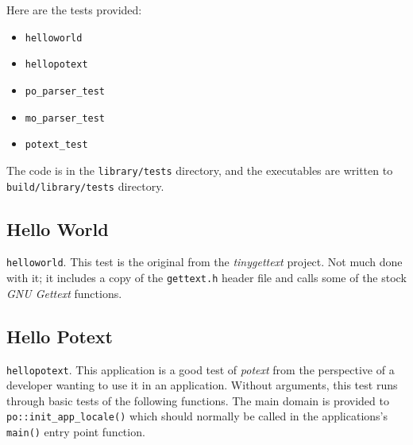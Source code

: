    Here are the tests provided:

    \begin{itemize}
        \item \texttt{helloworld}
        \item \texttt{hellopotext}
        \item \texttt{po\_parser\_test}
        \item \texttt{mo\_parser\_test}
        \item \texttt{potext\_test}
    \end{itemize}

   The code is in the \texttt{library/tests} directory, and the
   executables are written to \texttt{build/library/tests}
   directory.

\subsection{Hello World}
\label{subsec:potext_hello_world}

   \texttt{helloworld}.
   This test is the original from the \textsl{tinygettext} project.
   Not much done with it; it includes a copy of the
   \texttt{gettext.h} header file and calls some of the stock
   \textsl{GNU Gettext} functions.

\subsection{Hello Potext}
\label{subsec:potext_hello_potext}

   \texttt{hellopotext}.
   This application is a good test of \textsl{potext} from the
   perspective of a developer wanting to use it in an application.
   Without arguments, this test runs through basic tests of the following
   functions.
   The main domain is provided to \texttt{po::init\_app\_locale()}
   which should normally be called in the applications's
   \texttt{main()} entry point function.

